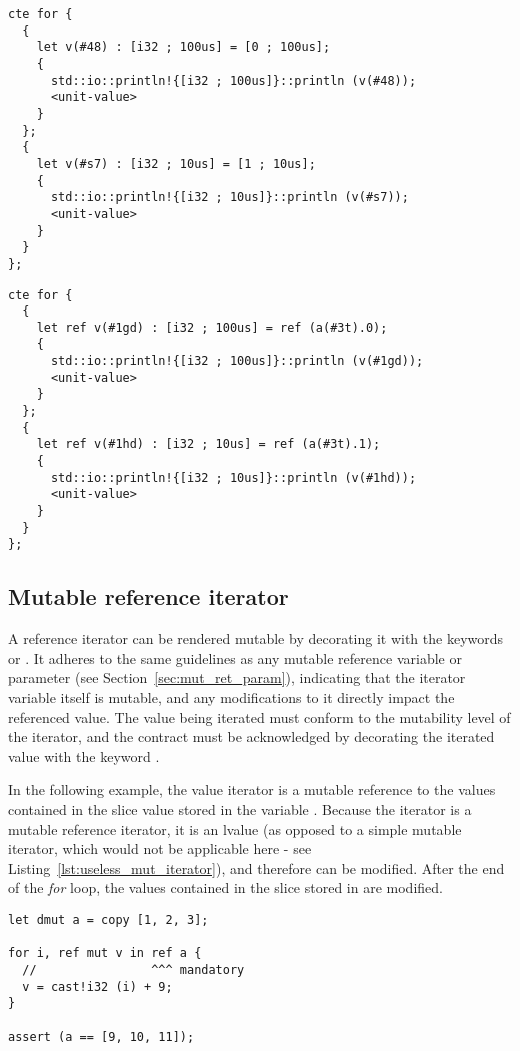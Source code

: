 \begin{lstlisting}[style=intermediateVerb, caption=By copy iteration on a tuple, label=lst:copy_value_iter_tu]
cte for {
  {
    let v(#48) : [i32 ; 100us] = [0 ; 100us];
    {
      std::io::println!{[i32 ; 100us]}::println (v(#48));
      <unit-value>
    }
  };
  {
    let v(#s7) : [i32 ; 10us] = [1 ; 10us];
    {
      std::io::println!{[i32 ; 10us]}::println (v(#s7));
      <unit-value>
    }
  }
};
\end{lstlisting}

\begin{lstlisting}[style=intermediateVerb, caption=By reference iteration on a tuple, label=lst:ref_value_iter_tu]
cte for {
  {
    let ref v(#1gd) : [i32 ; 100us] = ref (a(#3t).0);
    {
      std::io::println!{[i32 ; 100us]}::println (v(#1gd));
      <unit-value>
    }
  };
  {
    let ref v(#1hd) : [i32 ; 10us] = ref (a(#3t).1);
    {
      std::io::println!{[i32 ; 10us]}::println (v(#1hd));
      <unit-value>
    }
  }
};
\end{lstlisting}

\subsection{Mutable reference iterator}

A reference iterator can be rendered mutable by decorating it with the keywords
 or . It adheres to the same guidelines as any mutable
reference variable or parameter (see Section~\ref{sec:mut_ret_param}),
indicating that the iterator variable itself is mutable, and any modifications
to it directly impact the referenced value. The value being iterated must
conform to the mutability level of the iterator, and the contract must be
acknowledged by decorating the iterated value with the keyword .

In the following example, the value iterator is a mutable reference to the
values contained in the slice value stored in the variable . Because
the iterator is a mutable reference iterator, it is an lvalue (as opposed to a
simple mutable iterator, which would not be applicable here - see
Listing~\ref{lst:useless_mut_iterator}), and therefore can be modified. After
the end of the \textit{for} loop, the values contained in the slice stored in
 are modified.

\begin{lstlisting}[style=coloredverbatim, escapechar=@]
let dmut a = copy [1, 2, 3];

for i, ref mut v in ref a {
  //                ^^^ mandatory
  v = cast!i32 (i) + 9;
}

assert (a == [9, 10, 11]);
\end{lstlisting}

